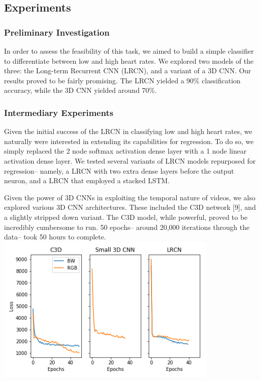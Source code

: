 \documentclass{article}
\begin{document}
\subsection[3.2] {Experiments}
\subsubsection[3.2.1]{Preliminary Investigation}
In order to assess the feasibility of this task, we aimed to build a simple classifier to differentiate between low and high heart rates. We explored two models of the three: the Long-term Recurrent CNN (LRCN), and a variant of a 3D CNN.
Our results proved to be fairly promising. The LRCN yielded a 90\% classification accuracy, while the 3D CNN yielded around 70\%.

\subsubsection[3.2.2]{Intermediary Experiments}
Given the initial success of the LRCN in classifying low and high heart rates, we naturally were interested in extending its capabilities for regression. To do so, we simply replaced the 2 node softmax activation dense layer with a 1 node linear activation dense layer. We tested several variants of LRCN models repurposed for regression-- namely, a LRCN with two extra dense layers before the output neuron, and a LRCN that employed a stacked LSTM.

Given the power of 3D CNNs in exploiting the temporal nature of videos, we also explored various 3D CNN architectures. These included the C3D network [9], and a slightly stripped down variant. The C3D model, while powerful, proved to be incredibly cumbersome to run. 50 epochs-- around 20,000 iterations through the data-- took 50 hours to complete.
\includegraphics[width=0.8\textwidth]{figs/losses.png}
\end{document}
